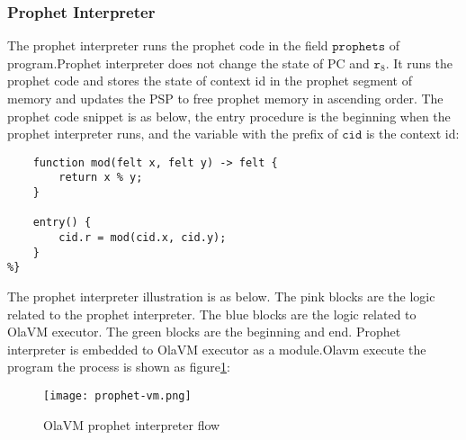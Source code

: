 \subsubsection{Prophet Interpreter}\label{subsec: prophet-interpreter}
The prophet interpreter runs the prophet code in the field $\texttt{prophets}$ of program.Prophet interpreter does not change the state of PC and $\texttt{r}_{8}$.
It runs the prophet code and stores the state of context id in the prophet segment of memory and updates the PSP to free prophet memory in ascending order.
The prophet code snippet is as below, the entry procedure is the beginning when the prophet interpreter runs, and the variable with the prefix of $\texttt{cid}$ is the context id:
\begin{lstlisting}[label={lst:prophet-demo}]
%{
    function mod(felt x, felt y) -> felt {
        return x % y;
    }

    entry() {
        cid.r = mod(cid.x, cid.y);
    }
%}
\end{lstlisting}

The prophet interpreter illustration is as below.
The pink blocks are the logic related to the prophet interpreter.
The blue blocks are the logic related to OlaVM executor.
The green blocks are the beginning and end.
Prophet interpreter is embedded to OlaVM executor as a module.Olavm execute the program the process is shown as figure\ref{fig:prophet-interpreter-logic}:
\begin{figure}[!htp]
    \centering
    \texttt{[image: prophet-vm.png]}
    \caption{OlaVM prophet interpreter flow}
    \label{fig:prophet-interpreter-logic}
\end{figure}
